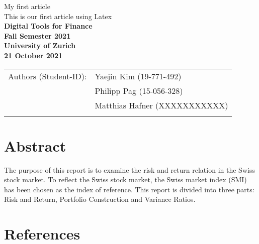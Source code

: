 \documentclass{article}
\begin{document}
\vspace*{3cm}

\begin{center}

\thispagestyle{empty}

{\Huge My first article}\\[0.5cm]
{\LARGE This is our first article using Latex}\\[1.5cm]

{\Large \bf Digital Tools for Finance}\\[1cm]

{\bf \large Fall Semester 2021\\
University of Zurich}\\[1cm]

{\large \bf 21 October 2021}\\[3cm]


\begin{tabular}{ll}
\hline
{Authors (Student-ID):} & { Yaejin Kim (19-771-492)}\\
& { Philipp Pag (15-056-328)}\\
& { Matthias Hafner (XXXXXXXXXXX) }\\
\hline \\
\end{tabular}



\end{center}


\newpage


\section*{Abstract}
 
The purpose of this report is to examine the risk and return relation in the Swiss stock market. To reflect the Swiss stock market, the Swiss market index (SMI) has been chosen as the index of reference. This report is divided into three parts: Risk and Return, Portfolio Construction and Variance Ratios.



\newpage

\blindtext

\newpage

\blindtext

\newpage

\section{References}
\begingroup
\renewcommand{\section}[2]{}

\endgroup

\newpage
\end{document}
